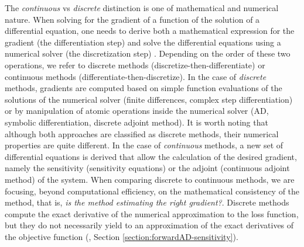 The \textit{continuous} vs \textit{discrete} distinction is one of mathematical and numerical nature. 
When solving for the gradient of a function of the solution of a differential equation, one needs to derive both a mathematical expression for the gradient (the differentiation step) and solve the differential equations using a numerical solver (the discretization step) \cite{bradley2013pde, Onken_Ruthotto_2020, FATODE2014, Sirkes_Tziperman_1997}. 
Depending on the order of these two operations, we refer to discrete methods (discretize-then-differentiate) or continuous methods (differentiate-then-discretize). 
In the case of \textit{discrete} methods, gradients are computed based on simple function evaluations of the solutions of the numerical solver (finite differences, complex step differentiation) or by manipulation of atomic operations inside the numerical solver (AD, symbolic differentiation, discrete adjoint method). 
It is worth noting that although both approaches are classified as discrete methods, their numerical properties are quite different.
In the case of \textit{continuous} methods, a new set of differential equations is derived that allow the calculation of the desired gradient, namely the sensitivity (sensitivity equations) or the adjoint (continuous adjoint method) of the system.   
When comparing discrete to continuous methods, we are focusing, beyond computational efficiency, on the mathematical consistency of the method, that is, \textit{is the method estimating the right gradient?}. 
Discrete methods compute the exact derivative of the numerical approximation to the loss function, but they do not necessarily yield to an approximation of the exact derivatives of the objective function (\cite{Walther_2007}, Section \ref{section:forwardAD-sensitivity}). 

